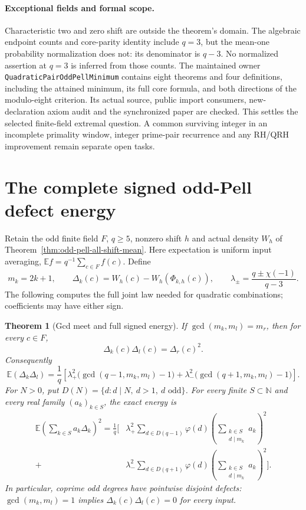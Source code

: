 \documentclass[11pt]{article}
\newtheorem{theorem}{Theorem}[section]
\begin{document}
\paragraph{Exceptional fields and formal scope.}
Characteristic two and zero shift are outside the theorem's domain.
The algebraic endpoint counts and core-parity identity include
\(q=3\), but the mean-one probability normalization does not:
its denominator is \(q-3\). No normalized assertion at \(q=3\)
is inferred from those counts.
The maintained owner \texttt{QuadraticPairOddPellMinimum} contains
eight theorems and four definitions, including the attained
minimum, its full core formula, and both directions of the
modulo-eight criterion. Its actual source, public import consumers,
new-declaration axiom audit and the synchronized paper are checked.
This settles the selected finite-field extremal question.
A common surviving integer in an incomplete primality window,
integer prime-pair recurrence and any RH/QRH improvement remain
separate open tasks.

\section{The complete signed odd-Pell defect energy}
\label{sec:odd-pell-joint-energy}

Retain the odd finite field \(F\), \(q\ge5\), nonzero shift \(h\)
and actual density \(W_h\) of Theorem~\ref{thm:odd-pell-all-shift-mean}.
Here expectation is uniform input averaging,
\(\mathbb E f=q^{-1}\sum_{c\in F}f(c)\). Define
\[
 m_k=2k+1,\qquad
 \Delta_k(c)=W_h(c)-W_h(\Phi_{k,h}(c)),\qquad
 \lambda_\pm=\frac{q\pm\chi(-1)}{q-3}.
\]
The following computes the full joint law needed for quadratic
combinations; coefficients may have either sign.

\begin{theorem}[Gcd meet and full signed energy]
\label{thm:odd-pell-joint-energy}
If \(\gcd(m_k,m_l)=m_r\), then for every \(c\in F\),
\[
                  \Delta_k(c)\Delta_l(c)=\Delta_r(c)^2.
\]
Consequently
\[
 \mathbb E(\Delta_k\Delta_l)=\frac1q
 \left[\lambda_+^2\bigl(\gcd(q-1,m_k,m_l)-1\bigr)
       +\lambda_-^2\bigl(\gcd(q+1,m_k,m_l)-1\bigr)\right].
\]
For \(N>0\), put \(D(N)=\{d:d\mid N,\ d>1,\ d\text{ odd}\}\).
For every finite \(S\subset\mathbb N\) and every real family
\((a_k)_{k\in S}\), the exact energy is
\[
\begin{split}
 \mathbb E\left(\sum_{k\in S}a_k\Delta_k\right)^2
 =\frac1q\bigg[
 &\lambda_+^2\sum_{d\in D(q-1)}\varphi(d)
       \left(\sum_{\substack{k\in S\\d\mid m_k}}a_k\right)^2\\
 {}+{}&\lambda_-^2\sum_{d\in D(q+1)}\varphi(d)
       \left(\sum_{\substack{k\in S\\d\mid m_k}}a_k\right)^2
 \bigg].
\end{split}
\]
In particular, coprime odd degrees have pointwise disjoint defects:
\(\gcd(m_k,m_l)=1\) implies \(\Delta_k(c)\Delta_l(c)=0\)
for every input.
\end{theorem}
\end{document}
